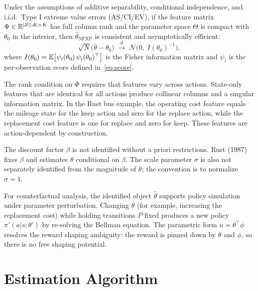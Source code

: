 \documentclass[11pt]{article}
\begin{document}
\begin{proposition}
Under the assumptions of additive separability, conditional independence, and i.i.d.\ Type I extreme value errors (AS/CI/EV), if the feature matrix $\Phi \in \mathbb{R}^{|\mathcal{S}||\mathcal{A}| \times K}$ has full column rank and the parameter space $\Theta$ is compact with $\theta_0$ in the interior, then $\hat\theta_{\text{NFXP}}$ is consistent and asymptotically efficient:
\begin{equation}
\label{eq:asymptotic}
\sqrt{N}\bigl(\hat\theta - \theta_0\bigr) \;\xrightarrow{d}\; \mathcal{N}\!\bigl(0,\; I(\theta_0)^{-1}\bigr),
\end{equation}
where $I(\theta_0) = \mathbb{E}\bigl[\psi_i(\theta_0)\,\psi_i(\theta_0)^\top\bigr]$ is the Fisher information matrix and $\psi_i$ is the per-observation score defined in~\eqref{eq:score}.
\end{proposition}

The rank condition on $\Phi$ requires that features vary across actions.
State-only features that are identical for all actions produce collinear columns and a singular information matrix.
In the Rust bus example, the operating cost feature equals the mileage state for the keep action and zero for the replace action, while the replacement cost feature is one for replace and zero for keep.
These features are action-dependent by construction.

The discount factor $\beta$ is not identified without a priori restrictions.
Rust (1987) fixes $\beta$ and estimates $\theta$ conditional on $\beta$.
The scale parameter $\sigma$ is also not separately identified from the magnitude of $\theta$; the convention is to normalize $\sigma = 1$.

For counterfactual analysis, the identified object $\hat\theta$ supports policy simulation under parameter perturbation.
Changing $\theta$ (for example, increasing the replacement cost) while holding transitions $P$ fixed produces a new policy $\pi'(a|s;\theta')$ by re-solving the Bellman equation.
The parametric form $u = \theta^\top \phi$ resolves the reward shaping ambiguity: the reward is pinned down by $\theta$ and $\phi$, so there is no free shaping potential.

\section{Estimation Algorithm}
\end{document}
